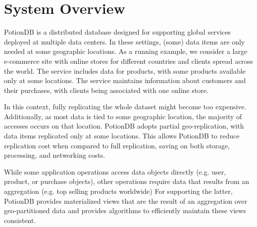 \documentclass[sigplan,twocolumn,review,anonymous]{acmart}
\newcommand{\outline}[1]{}
\begin{document}
%

\section{System Overview}
\label{sec:overview}


PotionDB is a distributed database designed for supporting global services deployed at multiple data centers. 
In these settings, (some) data items are only needed at some geographic locations. 
As a running example, we consider a large e-commerce site with online stores for different countries 
and clients spread across the world. 
The service includes data for products, with some products available 
only at some locations. The service maintains information about customers and their purchases, 
with clients being associated with one online store.

In this context, fully replicating the whole dataset might become too expensive.
Additionally, as most data is tied to some geographic location, the majority of accesses
occurs on that location. 
PotionDB adopts partial geo-replication, with data items replicated only at some locations.
This allows PotionDB to reduce replication cost when
compared to full replication, saving on both storage, processing, and networking costs.

While some application operations access data objects directly (e.g. user, product, or purchase objects),
other operations require data that results from an aggregation (e.g.  top
selling products worldwide)
For supporting the latter, %
PotionDB provides materialized views that are the result of an aggregation 
over geo-partitioned data and provides algorithms to efficiently maintain these views consistent.
\end{document}

